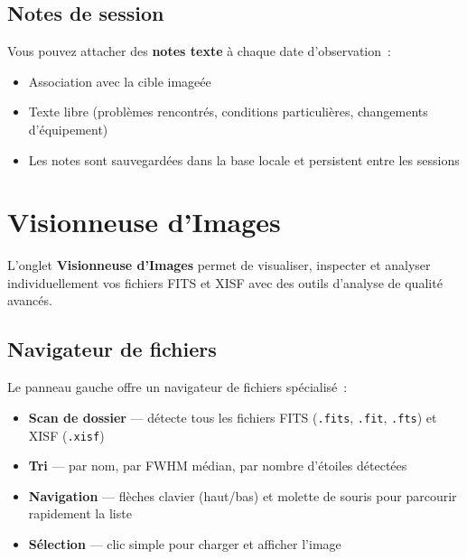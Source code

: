 \documentclass[a4paper,11pt]{article}
\begin{document}
\subsection{Notes de session}

Vous pouvez attacher des \textbf{notes texte} \`{a} chaque date d'observation~:

\begin{itemize}
    \item Association avec la cible image\'{e}e
    \item Texte libre (probl\`{e}mes rencontr\'{e}s, conditions particuli\`{e}res, changements d'\'{e}quipement)
    \item Les notes sont sauvegard\'{e}es dans la base locale et persistent entre les sessions
\end{itemize}


\section{Visionneuse d'Images}
\label{sec:visionneuse}

\begin{tcolorbox}[
    enhanced, colback=successgreen!8, colframe=successgreen!60,
    coltitle=white, fonttitle=\bfseries,
    title={NOUVEAU dans v1.3.0}
]
L'onglet \textbf{Visionneuse d'Images} permet de visualiser, inspecter et analyser individuellement vos fichiers FITS et XISF avec des outils d'analyse de qualit\'{e} avanc\'{e}s.
\end{tcolorbox}

\subsection{Navigateur de fichiers}

Le panneau gauche offre un navigateur de fichiers sp\'{e}cialis\'{e}~:

\begin{itemize}
    \item \textbf{Scan de dossier} --- d\'{e}tecte tous les fichiers FITS (\texttt{.fits}, \texttt{.fit}, \texttt{.fts}) et XISF (\texttt{.xisf})
    \item \textbf{Tri} --- par nom, par FWHM m\'{e}dian, par nombre d'\'{e}toiles d\'{e}tect\'{e}es
    \item \textbf{Navigation} --- fl\`{e}ches clavier (haut/bas) et molette de souris pour parcourir rapidement la liste
    \item \textbf{S\'{e}lection} --- clic simple pour charger et afficher l'image
\end{itemize}
\end{document}
